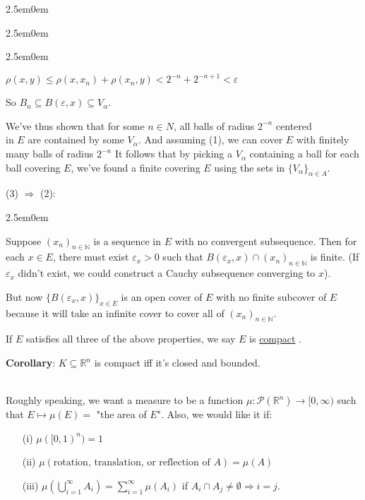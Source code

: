 \documentclass{book}
\newenvironment{myIndent}{%
   \begin{adjustwidth}{2.5em}{0em}%
}{%
   \end{adjustwidth}%
}
\newcommand{\udefine}[1]{{%
   \setulcolor{Red}%
   \setul{0.14em}{0.07em}%
   \ul{#1}%
}}
\newcommand{\blab}[1]{\textbf{#1}}
\newcommand{\mySepTwo}[1][.]{%
   {\noindent\color{#1}{\rule{6.5in}{0.5mm}}}\\%
}
\newcommand{\retTwo}{\hfill\bigbreak}
\begin{document}
\begin{myIndent}
\begin{myIndent}
\begin{myIndent}
         {\centering $\rho(x, y) \leq \rho(x, x_n) + \rho(x_n, y) < 2^{-n} + 2^{-n+1} < \varepsilon$ \retTwo\par}

         So $B_n \subseteq B(\varepsilon, x) \subseteq V_\alpha$.\retTwo

         We've thus shown that for some $n \in N$, all balls of radius $2^{-n}$ centered\\ in $E$ are contained by some $V_\alpha$. And assuming (1), we can cover $E$ with finitely many balls of radius $2^{-n}$ It follows that by picking a $V_\alpha$ containing a ball for each ball covering $E$, we've found a finite covering $E$ using the sets in $\{V_\alpha\}_{\alpha \in A}$.\retTwo
      \end{myIndent}

      (3) $\Longrightarrow$ (2):
      \begin{myIndent}
         Suppose $(x_n)_{n \in \mathbb{N}}$ is a sequence in $E$ with no convergent subsequence. Then for each $x \in E$, there must exist $\varepsilon_x > 0$ such that $B(\varepsilon_x, x) \cap (x_n)_{n \in \mathbb{N}}$ is finite. (If $\varepsilon_x$ didn't exist, we could construct a Cauchy subsequence converging to $x$).\newpage

         But now $\{B(\varepsilon_x, x)\}_{x \in E}$ is an open cover of $E$ with no finite subcover of $E$ because it will take an infinite cover to cover all of $(x_n)_{n \in \mathbb{N}}$.\retTwo
      \end{myIndent}
   \end{myIndent}

   If $E$ satisfies all three of the above properties, we say $E$ is \udefine{compact}.\retTwo

   \blab{Corollary}: $K \subseteq \mathbb{R}^n$ is compact iff it's closed and bounded.
\end{myIndent}

\mySepTwo

Roughly speaking, we want a measure to be a function $\mu: \mathcal{P}(\mathbb{R}^n) \longrightarrow [0, \infty)$ such that $E \mapsto \mu(E) =$ "the area of $E$". Also, we would like it if:
\begin{enumerate}
   \item[(i)] $\mu([0, 1)^n) = 1$
   \item[(ii)] $\mu(\text{rotation, translation, or reflection of } A) = \mu(A)$
   \item[(iii)] $\mu(\bigcup\limits_{i=1}^\infty A_i) = \sum\limits_{i = 1}^\infty \mu(A_i)$ if $A_i \cap A_j \neq \emptyset \Longrightarrow i = j$.
\end{enumerate}
\end{document}
